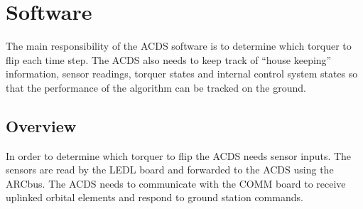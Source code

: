
\chapter{Software}
\label{ch:Software}

The main responsibility of the \ac{ACDS} software is to determine which torquer to flip each time step. The \ac{ACDS} also needs to keep track of ``house keeping'' information, sensor readings, torquer states and internal control system states so that the performance of the algorithm can be tracked on the ground. 

\section{Overview}

In order to determine which torquer to flip the \ac{ACDS} needs sensor inputs. The sensors are read by the \ac{LEDL} board and forwarded to the \ac{ACDS} using the \ac{ARC}bus. The \ac{ACDS} needs to communicate with the \ac{COMM} board to receive uplinked orbital elements and respond to ground station commands.

\begin{comment}
\begin{figure}[H]
    \centering
    \begin{tikzpicture}[node distance = 3cm, auto]
        \node [block] (AB) {\acs{ARC}bus interface};
        \node [block,right of=AB] (KF) {Kalman Filter};
        \node [block,above of=KF] (alg) {\acs{ACDS} algorithm};
        \node [block,above of=AB] (CMD) {\acs{ACDS} command parse};
        \node [block,right of=alg] (TQ) {Torquer Control and state tracking};
        \node [block,right of=KF] (HC) {House Keeping};
        \node [point,below of=KF] (DN)  {};

        \path [flow] (KF) -- (alg);
        \path [flow] (AB) -- (CMD);
        \path [flow] (alg) -- (TQ);
        \path [flow] (AB) -- (KF);

        \path [flow] (CMD) -- (KF);
        \path [flow] (CMD) -- (alg);

        \path [flow] (alg) -- (HC);
        \path [flow] (KF) -- (HC);
        \path [flow] (TQ) -- (HC);
        \path [flow] (HC) |- (DN);
        \path [flow] (DN) -| (AB);

    \end{tikzpicture}
    \caption{\acs{ACDS} software overview}
\end{figure}
\end{comment}

